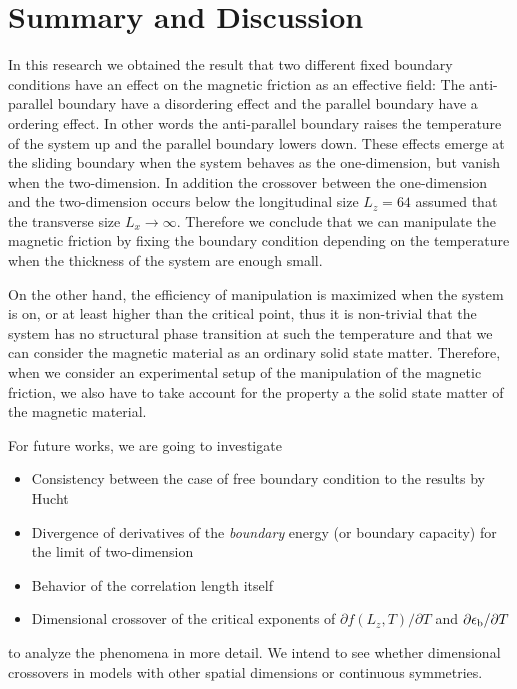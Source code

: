 \chapter{Summary and Discussion}\label{chap:Summary}

In this research we obtained the result that two different fixed boundary conditions have an effect on the magnetic friction as an effective field: The anti-parallel boundary have a disordering effect and the parallel boundary have a ordering effect. In other words the anti-parallel boundary raises the temperature of the system up and the parallel boundary lowers down. These effects emerge at the sliding boundary when the system behaves as the one-dimension, but vanish when the two-dimension. In addition the crossover between the one-dimension and the two-dimension occurs below the longitudinal size $L_{z}=64$ assumed that the transverse size $L_{x}\to\infty$. Therefore we conclude that we can manipulate the magnetic friction by fixing the boundary condition depending on the temperature when the thickness of the system are enough small.

On the other hand, the efficiency of manipulation is maximized when the system is on, or at least higher than the critical point, thus it is non-trivial that the system has no structural phase transition at such the temperature and that we can consider the magnetic material as an ordinary solid state matter. Therefore, when we consider an experimental setup of the manipulation of the magnetic friction, we also have to take account for the property a the solid state matter of the magnetic material.

For future works, we are going to investigate
\begin{itemize}
\item Consistency between the case of free boundary condition to the results by Hucht\cite{Hucht2009b}
\item Divergence of derivatives of the \textit{boundary} energy (or boundary capacity) for the limit of two-dimension
\item Behavior of the correlation length itself
\item Dimensional crossover of the critical exponents of $\partial f(L_{z},T)/\partial T$ and $\partial \epsilon_{\rm b}/\partial T$
\end{itemize}
to analyze the phenomena in more detail. We intend to see whether dimensional crossovers in models with other spatial dimensions or continuous symmetries.